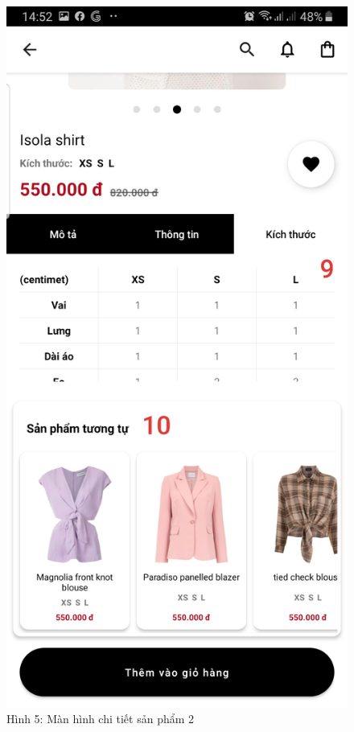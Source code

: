 \documentclass{beamer}
\begin{document}
\begin{frame}
    \begin{columns}
        \begin{figure}
            \centering
            \includegraphics[height=0.7\textheight]{images/05.png}
            \caption{\centering\tiny{Hình 5: Màn hình chi tiết sản phẩm 2}}


\end{figure}
\end{columns}
\end{frame}
\end{document}
